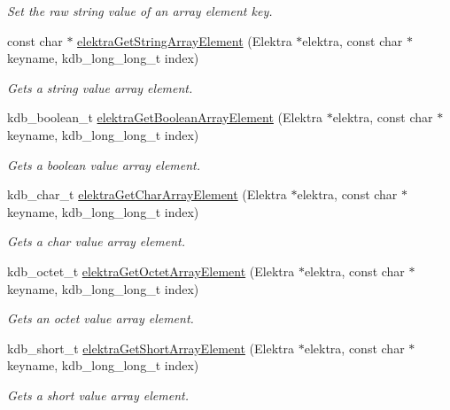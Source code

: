 \begin{DoxyCompactItemize}
\begin{DoxyCompactList}\small\item\em Set the raw string value of an array element key. \end{DoxyCompactList}\item 
const char $\ast$ \hyperlink{group__highlevel_gaf445216facccfc7ad6740b594e7a8f6e}{elektra\+Get\+String\+Array\+Element} (Elektra $\ast$elektra, const char $\ast$keyname, kdb\+\_\+long\+\_\+long\+\_\+t index)
\begin{DoxyCompactList}\small\item\em Gets a string value array element. \end{DoxyCompactList}\item 
kdb\+\_\+boolean\+\_\+t \hyperlink{group__highlevel_ga3b9f1f569c63be91d4211bafd0aae249}{elektra\+Get\+Boolean\+Array\+Element} (Elektra $\ast$elektra, const char $\ast$keyname, kdb\+\_\+long\+\_\+long\+\_\+t index)
\begin{DoxyCompactList}\small\item\em Gets a boolean value array element. \end{DoxyCompactList}\item 
kdb\+\_\+char\+\_\+t \hyperlink{group__highlevel_gacb11d0dbaaa6acbd6c16004a97ccd721}{elektra\+Get\+Char\+Array\+Element} (Elektra $\ast$elektra, const char $\ast$keyname, kdb\+\_\+long\+\_\+long\+\_\+t index)
\begin{DoxyCompactList}\small\item\em Gets a char value array element. \end{DoxyCompactList}\item 
kdb\+\_\+octet\+\_\+t \hyperlink{group__highlevel_ga2c67031aef8c34c639ec56b87006386d}{elektra\+Get\+Octet\+Array\+Element} (Elektra $\ast$elektra, const char $\ast$keyname, kdb\+\_\+long\+\_\+long\+\_\+t index)
\begin{DoxyCompactList}\small\item\em Gets an octet value array element. \end{DoxyCompactList}\item 
kdb\+\_\+short\+\_\+t \hyperlink{group__highlevel_ga5f078052ece43a36fe247515ada74a7d}{elektra\+Get\+Short\+Array\+Element} (Elektra $\ast$elektra, const char $\ast$keyname, kdb\+\_\+long\+\_\+long\+\_\+t index)
\begin{DoxyCompactList}\small\item\em Gets a short value array element. \end{DoxyCompactList}\item 

\end{DoxyCompactItemize}
